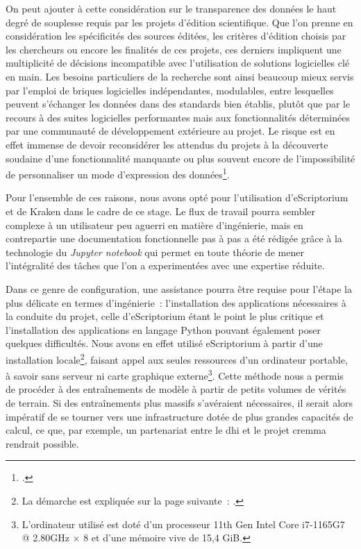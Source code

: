 \documentclass[a4paper,12pt,twoside]{book}
\begin{document}
				On peut ajouter à cette considération sur le transparence des données le haut degré de souplesse requis par les projets d'édition scientifique. Que l'on prenne en considération les spécificités des sources éditées, les critères d'édition choisis par les chercheurs ou encore les finalités de ces projets, ces derniers impliquent une multiplicité de décisions incompatible avec l'utilisation de solutions logicielles clé en main. Les besoins particuliers de la recherche sont ainsi beaucoup mieux servis par l'emploi de briques logicielles indépendantes, modulables, entre lesquelles peuvent s'échanger les données dans des standards bien établis, plutôt que par le recours à des suites logicielles performantes mais aux fonctionnalités déterminées par une communauté de développement extérieure au projet. Le risque est en effet immense de devoir reconsidérer les attendus du projets à la découverte soudaine d'une fonctionnalité manquante ou plus souvent encore de l'impossibilité de personnaliser un mode d'expression des données\footcite{stokesEScriptoriumVREManuscript2021}.
				
				Pour l'ensemble de ces raisons, nous avons opté pour l'utilisation d'eScriptorium et de Kraken dans le cadre de ce stage. Le flux de travail pourra sembler complexe à un utilisateur peu aguerri en matière d'ingénierie, mais en contrepartie une documentation fonctionnelle pas à pas a été rédigée grâce à la technologie du \textit{Jupyter notebook} qui permet en toute théorie de mener l'intégralité des tâches que l'on a experimentées avec une expertise réduite.
							
				Dans ce genre de configuration, une assistance pourra être requise pour l'étape la plus délicate en termes d'ingénierie~: l'installation des applications nécessaires à la conduite du projet, celle d'eScriptorium étant le point le plus critique et l'installation des applications en langage Python pouvant également poser quelques difficultés. Nous avons en effet utilisé eScriptorium à partir d'une installation locale\footnote{La démarche est expliquée sur la page suivante~: \cite{DockerInstallInstallation}.}, faisant appel aux seules ressources d'un ordinateur portable, à savoir sans serveur ni carte graphique externe\footnote{L'ordinateur utilisé est doté d'un processeur 11th Gen Intel Core i7-1165G7 @ 2.80GHz × 8 et d'une mémoire vive de 15,4 GiB.}. Cette méthode nous a permis de procéder à des entraînements de modèle à partir de petits volumes de vérités de terrain. Si des entraînements plus massifs s'avéraient nécessaires, il serait alors impératif de se tourner vers une infrastructure dotée de plus grandes capacités de calcul, ce que, par exemple, un partenariat entre le \gls{dhi} et le projet \gls{cremma} rendrait possible.
						
\end{document}
